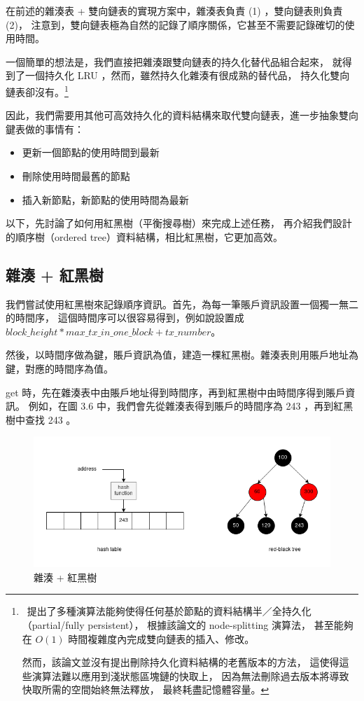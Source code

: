在前述的雜湊表 + 雙向鏈表的實現方案中，雜湊表負責 (1) ，雙向鏈表則負責 (2)，
注意到，雙向鏈表極為自然的記錄了順序關係，它甚至不需要記錄確切的使用時間。

一個簡單的想法是，我們直接把雜湊跟雙向鏈表的持久化替代品組合起來，
就得到了一個持久化 LRU ，然而，雖然持久化雜湊有很成熟的替代品，
持久化雙向鏈表卻沒有。\footnote{
~\cite{driscoll1986making}提出了多種演算法能夠使得任何基於節點的資料結構半／全持久化（partial/fully persistent），
根據該論文的 node-splitting 演算法，
甚至能夠在 $O(1)$ 時間複雜度內完成雙向鏈表的插入、修改。

然而，該論文並沒有提出刪除持久化資料結構的老舊版本的方法，
這使得這些演算法難以應用到淺狀態區塊鏈的快取上，
因為無法刪除過去版本將導致快取所需的空間始終無法釋放，
最終耗盡記憶體容量。
}

因此，我們需要用其他可高效持久化的資料結構來取代雙向鏈表，進一步抽象雙向鍵表做的事情有：

\begin{itemize}
  \item 更新一個節點的使用時間到最新
  \item 刪除使用時間最舊的節點
  \item 插入新節點，新節點的使用時間為最新
\end{itemize}

以下，先討論了如何用紅黑樹\cite{guibas1978dichromatic}（平衡搜尋樹）來完成上述任務，
再介紹我們設計的順序樹（ordered tree）資料結構，相比紅黑樹，它更加高效。

\subsection{雜湊 + 紅黑樹}

我們嘗試使用紅黑樹來記錄順序資訊。首先，為每一筆賬戶資訊設置一個獨一無二的時間序，
這個時間序可以很容易得到，例如說設置成 $block\_height * max\_tx\_in\_one\_block + tx\_number$。

然後，以時間序做為鍵，賬戶資訊為值，建造一棵紅黑樹。雜湊表則用賬戶地址為鍵，對應的時間序為值。

get 時，先在雜湊表中由賬戶地址得到時間序，再到紅黑樹中由時間序得到賬戶資訊。
例如，在圖 3.6 中，我們會先從雜湊表得到賬戶的時間序為 243 ，再到紅黑樹中查找 243 。

\begin{figure}[h!]
\includegraphics[width=\textwidth]{雜湊紅黑樹}
\caption{雜湊 + 紅黑樹}
\end{figure}

